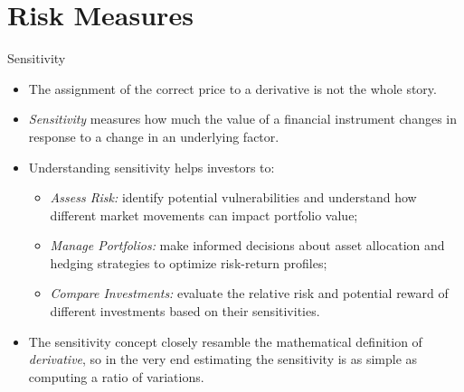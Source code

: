 \documentclass{beamer}
\begin{document}
\section{Risk Measures}
\begin{frame}{Sensitivity}
\begin{itemize}
\item The assignment of the correct price to a derivative is not the whole story.
\item \emph{Sensitivity} measures how much the value of a financial instrument changes in response to a change in an underlying factor.  
\item Understanding sensitivity helps investors to:
\begin{itemize}
    \item \emph{Assess Risk:} identify potential vulnerabilities and understand how different market movements can impact portfolio value;
    \item \emph{Manage Portfolios:} make informed decisions about asset allocation and hedging strategies to optimize risk-return profiles;
    \item \emph{Compare Investments:} evaluate the relative risk and potential reward of different investments based on their sensitivities.
\end{itemize}
\item The sensitivity concept closely resamble the mathematical definition of \emph{derivative}, so in the very end estimating the sensitivity is as simple as computing a ratio of variations.
\end{itemize}
\end{frame}

\end{document}
